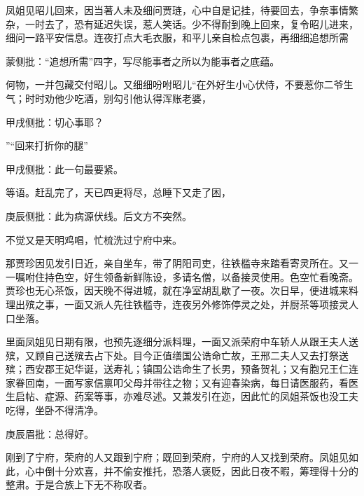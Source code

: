 \begin{parag}


    凤姐见昭儿回来，因当著人未及细问贾琏，心中自是记挂，待要回去，争奈事情繁杂，一时去了，恐有延迟失误，惹人笑话。少不得耐到晚上回来，复令昭儿进来，细问一路平安信息。连夜打点大毛衣服，和平儿亲自检点包裹，再细细追想所需\begin{note}蒙侧批：“追想所需”四字，写尽能事者之所以为能事者之底蕴。\end{note}何物，一并包藏交付昭儿。又细细吩咐昭儿“在外好生小心伏侍，不要惹你二爷生气；时时劝他少吃酒，别勾引他认得浑账老婆，\begin{note}甲戌侧批：切心事耶？\end{note}”“回来打折你的腿”\begin{note}甲戌侧批：此一句最要紧。\end{note}等语。赶乱完了，天已四更将尽，总睡下又走了困，\begin{note}庚辰侧批：此为病源伏线。后文方不突然。\end{note}不觉又是天明鸡唱，忙梳洗过宁府中来。
\end{parag}


\begin{parag}


    那贾珍因见发引日近，亲自坐车，带了阴阳司吏，往铁槛寺来踏看寄灵所在。又一一嘱咐住持色空，好生领备新鲜陈设，多请名僧，以备接灵使用。色空忙看晚斋。贾珍也无心茶饭，因天晚不得进城，就在净室胡乱歇了一夜。次日早，便进城来料理出殡之事，一面又派人先往铁槛寺，连夜另外修饰停灵之处，并厨茶等项接灵人口坐落。
\end{parag}


\begin{parag}


    里面凤姐见日期有限，也预先逐细分派料理，一面又派荣府中车轿人从跟王夫人送殡，又顾自己送殡去占下处。目今正值缮国公诰命亡故，王邢二夫人又去打祭送殡；西安郡王妃华诞，送寿礼；镇国公诰命生了长男，预备贺礼；又有胞兄王仁连家眷回南，一面写家信禀叩父母并带往之物；又有迎春染病，每日请医服药，看医生启帖、症源、药案等事，亦难尽述。又兼发引在迩，因此忙的凤姐茶饭也没工夫吃得，坐卧不得清净。\begin{note}庚辰眉批：总得好。\end{note}刚到了宁府，荣府的人又跟到宁府；既回到荣府，宁府的人又找到荣府。凤姐见如此，心中倒十分欢喜，并不偷安推托，恐落人褒贬，因此日夜不暇，筹理得十分的整肃。于是合族上下无不称叹者。
\end{parag}


